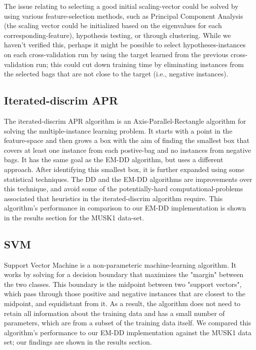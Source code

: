 \documentclass[conference]{IEEEtran}
\begin{document}
The issue relating to selecting a good initial scaling-vector could be solved by using various feature-selection methods, such as Principal Component Analysis (the scaling vector could be initialized based on the eigenvalues for each corresponding-feature), hypothesis testing, or through clustering. While we haven't verified this, perhaps it might be possible to select hypotheses-instances on each cross-validation run by using the target learned from the previous cross-validation run; this could cut down training time by eliminating instances from the selected bags that are not close to the target (i.e., negative instances).

\subsection{Iterated-discrim APR}

The iterated-discrim APR algorithm is an Axis-Parallel-Rectangle algorithm for solving the multiple-instance learning problem\cite{dietterich1997solving}. It starts with a point in the feature-space and then grows a box with the aim of finding the smallest box that covers at least one instance from each postive-bag and no instances from negative bags. It has the same goal as the EM-DD algorithm, but uses a different approach. After identifying this smallest box, it is further expanded using some statistical techniques. The DD and the EM-DD algorithms are improvements over this technique, and avoid some of the potentially-hard computational-problems associated that heuristics in the iterated-discrim algorithm require. This algorithm's performance in comparison to our EM-DD implementation is shown in the results section for the MUSK1 data-set.

\subsection{SVM}

Support Vector Machine\cite{cortes1995support} is a non-parameteric machine-learning algorithm. It works by solving for a decision boundary that maximizes the "margin" between the two classes. This boundary is the midpoint between two "support vectors", which pass through those positive and negative instances that are closest to the midpoint, and equidistant from it. As a result, the algorithm does not need to retain all information about the training data and has a small number of parameters, which are from a subset of the training data itself. We compared this algorithm's performance to our EM-DD implementation against the MUSK1 data set; our findings are shown in the results section.
\end{document}
